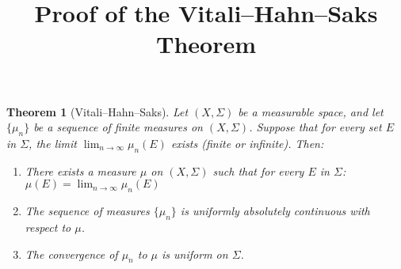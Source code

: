 \documentclass{article}
\newtheorem{theorem}{Theorem}
\begin{document}
\title{Proof of the Vitali--Hahn--Saks Theorem}

\date{}

\maketitle

\begin{theorem}
  [Vitali--Hahn--Saks] Let $(X, \Sigma)$ be a measurable space, and let
  $\{\mu_n \}$ be a sequence of finite measures on $(X, \Sigma)$. Suppose that
  for every set $E$ in $\Sigma$, the limit $\lim_{n \to \infty} \mu_n (E)$
  exists (finite or infinite). Then:
  \begin{enumerate}
    \item There exists a measure $\mu$ on $(X, \Sigma)$ such that for every
    $E$ in $\Sigma$: $\mu (E) = \lim_{n \to \infty} \mu_n (E)$
    
    \item The sequence of measures $\{\mu_n \}$ is uniformly absolutely
    continuous with respect to $\mu$.
    
    \item The convergence of $\mu_n$ to $\mu$ is uniform on $\Sigma$.
  \end{enumerate}
\end{theorem}
\end{document}
